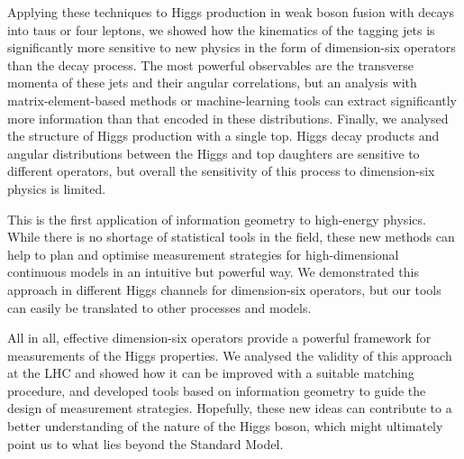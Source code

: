 Applying these techniques to Higgs production in weak boson fusion
with decays into taus or four leptons, we showed how the kinematics of
the tagging jets is significantly more sensitive to new physics in the
form of dimension-six operators than the decay process. The most
powerful observables are the transverse momenta of these jets and
their angular correlations, but an analysis with matrix-element-based
methods or machine-learning tools can extract significantly more
information than that encoded in these distributions. Finally, we
analysed the structure of Higgs production with a single top. Higgs
decay products and angular distributions between the Higgs and top
daughters are sensitive to different operators, but overall the
sensitivity of this process to dimension-six physics is limited.

This is the first application of information geometry to high-energy
physics. While there is no shortage of statistical tools in the field,
these new methods can help to plan and optimise measurement strategies
for high-dimensional continuous models in an intuitive but powerful
way. We demonstrated this approach in different Higgs channels for
dimension-six operators, but our tools can easily be translated to
other processes and models.

\newparagraph
%
All in all, effective dimension-six operators provide a powerful
framework for measurements of the Higgs properties. We analysed the
validity of this approach at the LHC and showed how it can be improved
with a suitable matching procedure, and developed tools based on
information geometry to guide the design of measurement
strategies. Hopefully, these new ideas can contribute to a better
understanding of the nature of the Higgs boson, which might ultimately
point us to what lies beyond the Standard Model.

